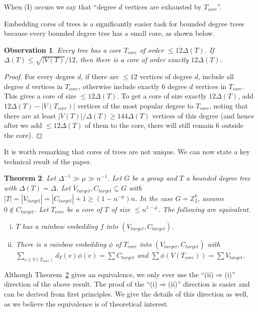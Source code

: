 \documentclass[a4paper,11pt,hidelinks]{amsart}
\newtheorem{theorem}{Theorem}[section]
\newtheorem{observation}[theorem]{Observation}
\theoremstyle{definition}
\newcommand{\id}{{0}}%
\begin{document}
When (I)   occurs we say that ``degree $d$ vertices are exhausted by $T_{core}$''. 
\par Embedding cores of trees is a significantly easier task for bounded degree trees because every bounded degree tree has a small core, as shown below.
\begin{observation}\label{Observation_small_core}
Every tree has a core $T_{core}$ of order $\leq 12\Delta(T)$.  If $\Delta(T)\leq \sqrt{|V(T)}/12$, then there is a core of order exactly $12\Delta(T)$.
\end{observation}
\begin{proof}
For every degree $d$, if there are $\leq 12$ vertices of degree $d$, include all degree $d$ vertices in $T_{core}$, otherwise include exactly 6 degree $d$ vertices in $T_{core}$. This gives a core of size $\leq 12\Delta(T)$. To get a core of size exactly $12\Delta(T)$, add $12\Delta(T)-|V(T_{core})|$ vertices of the most popular degree to $T_{core}$, noting that there are at least $|V(T)|/\Delta(T)\geq 144\Delta(T)$ vertices of this degree (and hence after we add $\leq 12\Delta(T)$ of them to the core, there will still remain 6 outside the core).
\end{proof}
It is worth remarking that cores of trees are not unique.
We can now state a key technical result of the paper. %
\begin{theorem}\label{Theorem_embed_tree_prescribed_sets}
Let $\Delta^{-1}\gg\mu\gg n^{-1}$.
Let $G$ be a group and $T$ a bounded degree tree with $\Delta(T)=\Delta$. Let $V_{target},C_{target}\subseteq G$ with $|T|=|V_{target}|=|C_{target}|+1\geq (1-n^{-\mu})n$. In the case $G=\mathbb{Z}_2^k$, assume $\id \not\in C_{target}$. Let $T_{core}$ be a core of $T$ of size $\leq n^{1-\mu}$. The following are equivalent.
\begin{enumerate}[(i)]
\item  $T$ has a rainbow  embedding $f$ into $(V_{target},C_{target})$.
\item There is a rainbow embedding $\phi$ of $T_{core}$ into $(V_{target},C_{target})$ with $\sum_{v\in V(T_{core})}d_T(v)\phi(v)=\sum C_{target}$ and $\sum \phi(V(T_{core}))=\sum V_{target}$.
\end{enumerate} 
\end{theorem}
Although Theorem~\ref{Theorem_embed_tree_prescribed_sets} gives an equivalence, we only ever use the ``(ii)$\Rightarrow$(i)'' direction of the above result. The proof of the ``(i)$\Rightarrow$(ii)'' direction is easier and can be derived from first principles. We give the details of this direction as well, as we believe the equivalence is of theoretical interest. 
\end{document}
